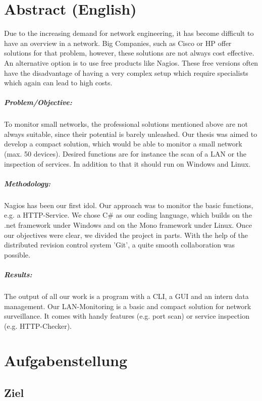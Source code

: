 \documentclass[12pt,a4paper]{report}
\begin{document}
\begin{onehalfspace}
\chapter{Abstract (English)}
Due to the increasing demand for network engineering, it has become difficult to have an overview in a network. Big Companies, such as Cisco or HP offer solutions for that problem, however, these solutions are not always cost effective. An alternative option is to use free products like Nagios. These free versions often have the disadvantage of having a very complex setup which require specialists which again can lead to high costs.
\paragraph{Problem/Objective:}
To monitor small networks, the professional solutions mentioned above are not always suitable, since their potential is barely unleashed. Our thesis was aimed to develop a compact solution, which would be able to monitor a small network (max. 50 devices). Desired functions are for instance the scan of a LAN or the inspection of services. In addition to that it should run on Windows and Linux.
\paragraph{Methodology:}
Nagios has been our first idol. Our approach was to monitor the basic functions, e.g. a HTTP-Service. 
We chose C\# as our coding language, which builds on the .net framework under Windows and on the Mono framework under Linux. Once our objectives were clear, we divided the project in parts. With the help of the distributed revision control system 'Git', a quite smooth collaboration was possible.
\paragraph{Results:}
The output of all our work is a program with a CLI, a GUI and an intern data management. Our LAN-Monitoring is a basic and compact solution for network surveillance. It comes with handy features (e.g. port scan) or service inspection (e.g. HTTP-Checker).

\chapter{Aufgabenstellung}

\section{Ziel}


\end{onehalfspace}
\end{document}

